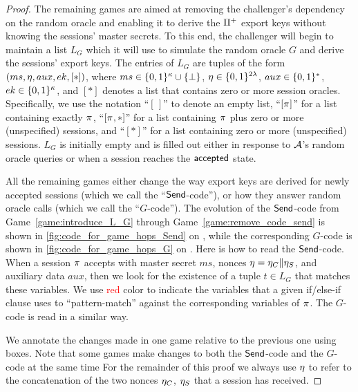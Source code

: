 \begin{proof}
The remaining games are aimed at removing the challenger's dependency on the random oracle
and enabling it to derive the $\mathrm{\Pi}^{+}$ export keys without knowing the sessions' master secrets.
To this end,
the challenger will begin to maintain a list $L_G$
which it will use to simulate the  random oracle $G$
and derive the sessions' export keys.
The entries of $L_G$ are tuples of the form $(ms, \eta, aux, ek, [*])$,
where $ms \in \lbrace 0, 1 \rbrace^\kappa \cup \lbrace \bot \rbrace$,
$\eta \in \lbrace 0, 1 \rbrace^{2\lambda}$,
$aux \in \lbrace 0, 1 \rbrace^*$,
$ek \in \lbrace 0, 1 \rbrace^\kappa$,
and $[*]$ denotes a list that contains zero or more session oracles.
Specifically, 
we use the notation ``$[\,]$'' to denote an empty list,
``$[\oracle]$'' for a list containing exactly $\oracle$,
``$[\oracle,*]$'' for a list containing $\oracle$ plus zero or more (unspecified) sessions,
and ``$[*]$'' for a list containing zero or more (unspecified) sessions.
$L_G$ is initially empty and is filled out either in response to $\mathcal{A}$'s random oracle queries or when a session reaches the $\mathsf{accepted}$ state.

All the remaining games either change the way export keys are derived for newly accepted sessions
%
(which we call the ``$\mathsf{Send}$-code''), 
or how they answer random oracle calls
(which we call the ``$G$-code'').
The evolution of the $\mathsf{Send}$-code from Game~\ref{game:introduce_L_G} through Game~\ref{game:remove_code_send} is shown in \cref{fig:code_for_game_hops_Send} on ,
while the corresponding $G$-code is shown in \cref{fig:code_for_game_hops_G} on .
Here is how to read the $\mathsf{Send}$-code.
When a session $\oracle$ accepts with master secret $ms$,
nonces $\eta = \eta_{C} \| \eta_{S}$, and auxiliary data $aux$,
then we look for the existence of  a tuple $t \in L_G$ that matches these variables.
We use \textcolor{red}{red} color to indicate the variables that a given if/else-if clause uses to ``pattern-match'' against the corresponding variables of $\oracle$.
The $G$-code is read in a similar way.

We annotate the changes made in one game relative to the previous one using boxes.
Note that some games make changes to both the $\mathsf{Send}$-code and
the $G$-code at the same time
For the remainder of this proof we always use $\eta$ to refer to the concatenation of the two nonces $\eta_{C}$, $\eta_{S}$ that a session has received.






\end{proof}
